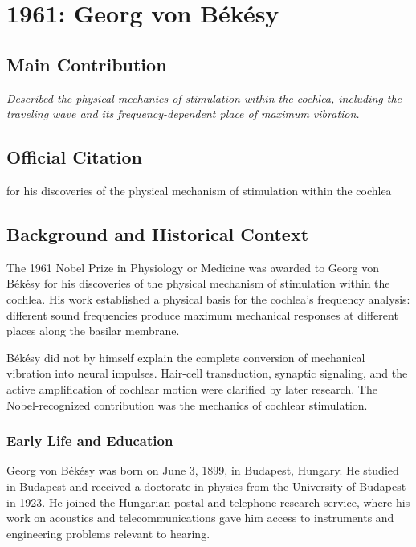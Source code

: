 \chapter[1961 --- B\'ek\'esy]{1961: Georg von B\'ek\'esy}
\label{ch:1961_georgvonbekesy}

\section*{Main Contribution}

\textit{Described the physical mechanics of stimulation within the cochlea, including the traveling wave and its frequency-dependent place of maximum vibration.}\cite{nobel-1961,lecture-1961}

\section{Official Citation}

for his discoveries of the physical mechanism of stimulation within the cochlea

\section{Background and Historical Context}

The 1961 Nobel Prize in Physiology or Medicine was awarded to Georg von B\'ek\'esy for his discoveries of the physical mechanism of stimulation within the cochlea. His work established a physical basis for the cochlea's frequency analysis: different sound frequencies produce maximum mechanical responses at different places along the basilar membrane.

B\'ek\'esy did not by himself explain the complete conversion of mechanical vibration into neural impulses. Hair-cell transduction, synaptic signaling, and the active amplification of cochlear motion were clarified by later research. The Nobel-recognized contribution was the mechanics of cochlear stimulation.

\subsection{Early Life and Education}

Georg von B\'ek\'esy was born on June 3, 1899, in Budapest, Hungary. He studied in Budapest and received a doctorate in physics from the University of Budapest in 1923. He joined the Hungarian postal and telephone research service, where his work on acoustics and telecommunications gave him access to instruments and engineering problems relevant to hearing.

